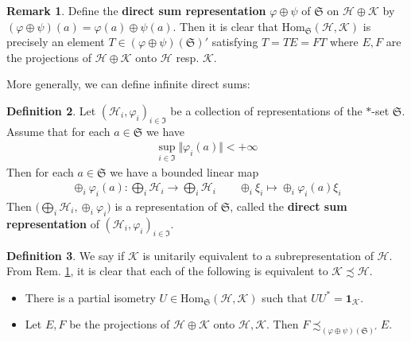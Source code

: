 \documentclass[12pt,b5paper,notitlepage]{article}
\theoremstyle{definition}
\newtheorem{df}{Definition}[section]
\newtheorem{rem}[df]{Remark}
\theoremstyle{plain}
\newcommand{\fk}{\mathfrak}
\newcommand{\mc}{\mathcal}
\newcommand{\idt}{\mathbf{1}}
\newcommand{\Hom}{\mathrm{Hom}}
\numberwithin{equation}{section}
\begin{document}
\begin{rem}\label{lb74}
Define the \textbf{direct sum representation} $\varphi\oplus\psi$ of $\fk S$ on $\mc H\oplus\mc K$ by $(\varphi\oplus\psi)(a)=\varphi(a)\oplus\psi(a)$. Then it is clear that $\Hom_{\fk S}(\mc H,\mc K)$ is precisely an element $T\in (\varphi\oplus\psi)(\fk S)'$ satisfying $T=TE=FT$ where $E,F$ are the projections of $\mc H\oplus\mc K$ onto $\mc H$ resp. $\mc K$.
\end{rem}


More generally, we can define infinite direct sums:


\begin{df}
Let $(\mc H_i,\varphi_i)_{i\in\fk I}$ be a collection of representations of the $*$-set $\fk S$. Assume that for each $a\in\fk S$ we have
\begin{align*}
\sup_{i\in\fk I}\Vert\varphi_i(a)\Vert<+\infty
\end{align*}
Then for each $a\in\fk S$ we have a bounded linear map
\begin{align*}
\oplus_i\varphi_i(a):\bigoplus_i\mc H_i\rightarrow \bigoplus_i\mc H_i\qquad \oplus_i\xi_i\mapsto \oplus_i\varphi_i(a)\xi_i
\end{align*}
Then $\big(\bigoplus_i\mc H_i,\oplus_i\varphi_i\big)$ is a representation of $\fk S$, called the \textbf{direct sum representation} of $(\mc H_i,\varphi_i)_{i\in\fk I}$.
\end{df}




\begin{df}
We say \pmb{$\mc K\precsim\mc H$} if $\mc K$ is unitarily equivalent to a subrepresentation of $\mc H$. From Rem. \ref{lb74}, it is clear that each of the following is equivalent to $\mc K\precsim\mc H$.
\begin{itemize}
\item There is a partial isometry $U\in\Hom_{\fk S}(\mc H,\mc K)$ such that $UU^*=\idt_{\mc K}$.
\item Let $E,F$ be the projections of $\mc H\oplus\mc K$ onto $\mc H,\mc K$. Then $F\precsim_{(\varphi\oplus\psi)(\fk S)'} E$.
\end{itemize}
\end{df}
\end{document}
